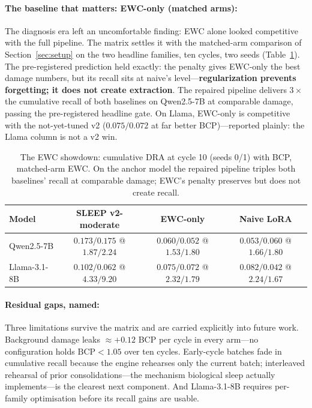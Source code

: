 \paragraph{The baseline that matters: EWC-only (matched arms):} The diagnosis era left an uncomfortable finding: EWC alone looked competitive with the full pipeline. The matrix settles it with the matched-arm comparison of Section~\ref{sec:setup} on the two headline families, ten cycles, two seeds (Table~\ref{tab:matrix_ewc}). The pre-registered prediction held exactly: the penalty gives EWC-only the best damage numbers, but its recall sits at naive's level---\textbf{regularization prevents forgetting; it does not create extraction}. The repaired pipeline delivers $3\times$ the cumulative recall of both baselines on Qwen2.5-7B at comparable damage, passing the pre-registered headline gate. On Llama, EWC-only is competitive with the not-yet-tuned v2 ($0.075/0.072$ at far better BCP)---reported plainly: the Llama column is not a v2 win.

\begin{table}[t]
\centering
\caption{The EWC showdown: cumulative DRA at cycle 10 (seeds 0/1) with BCP, matched-arm EWC. On the anchor model the repaired pipeline triples both baselines' recall at comparable damage; EWC's penalty preserves but does not create recall.}
\label{tab:matrix_ewc}
\begin{tabular}{lccc}
\toprule
Model & SLEEP v2-moderate & EWC-only & Naive LoRA \\
\midrule
Qwen2.5-7B   & $\mathbf{0.173/0.175}$ @ $1.87/2.24$ & $0.060/0.052$ @ $1.53/1.80$ & $0.053/0.060$ @ $1.66/1.80$ \\
Llama-3.1-8B & $0.102/0.062$ @ $4.33/9.20$ & $0.075/0.072$ @ $2.32/1.79$ & $0.082/0.042$ @ $2.24/1.67$ \\
\bottomrule
\end{tabular}
\end{table}

\paragraph{Residual gaps, named:} Three limitations survive the matrix and are carried explicitly into future work. Background damage leaks $\approx +0.12$ BCP per cycle in every arm---no configuration holds $\mathrm{BCP} < 1.05$ over ten cycles. Early-cycle batches fade in cumulative recall because the engine rehearses only the current batch; interleaved rehearsal of prior consolidations---the mechanism biological sleep actually implements---is the clearest next component. And Llama-3.1-8B requires per-family optimisation before its recall gains are usable.
